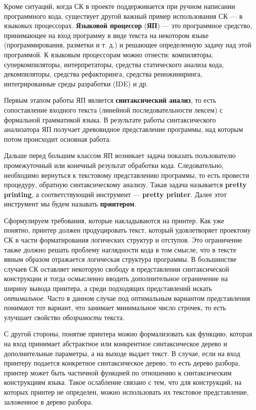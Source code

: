 Кроме ситуаций, когда СК в проекте поддерживается при ручном написании
программного кода, существует другой важный пример использования СК ---
в языковых процессорах. \textbf{Языковой процессор} (\textbf{ЯП}) ---
это программное средство, принимающее на вход программу в виде текста
на некотором языке (программирования, разметки и т. д.) и решающее
определенную задачу над этой программой. К языковым процессорам можно
отнести: компиляторы, суперкомпиляторы, интерпретаторы,
средства статического анализа кода, декомпиляторы, средства рефакторинга,
средства реинжиниринга, интегрированные среды разработки (IDE) и др.

Первым этапом работы ЯП является \textbf{синтаксический анализ}, то есть
сопоставление входного текста (линейной последовательности лексем) с формальной
грамматикой языка. В результате работы синтаксического анализатора ЯП получает
древовидное представление программы, над которым потом происходит основная работа.

Дальше перед большим классом ЯП возникает задача показать пользователю
промежуточный или конечный результат обработки кода.
Следовательно, необходимо вернуться к текстовому представлению программы,
то есть провести процедуру, обратную синтаксическому анализу. Такая задача
называется \textbf{pretty printing}, а соответствующий инструмент ---
\textbf{pretty printer}. Далее этот инструмент мы будем называть
\textbf{принтером}.

Сформулируем требования, которые накладываются на принтер.
Как уже понятно, принтер должен
продуцировать текст, который удовлетворяет проектому СК в части
форматирования логических структур и отступов.
Это ограничение также должно решать проблему наглядности кода в том смысле,
что в тексте явным образом отражается логическая структура программы.
В большинстве случаев СК оставляет некоторую свободу в представлении
синтаксической конструкции и тогда осмысленно вводить дополнительное
ограничение на ширину вывода принтера, а среди подходящих представлений
искать \textit{оптимальное}. Часто в данном случае под
оптимальным вариантом представления понимают тот вариант,
что занимает минимальное число строчек,
то есть улучшает свойство \textit{обозримости} текста.

С другой стороны, понятие принтера можно формализовать как функцию,
которая на вход принимает
абстрактное или конкрентное синтаксическое дерево и дополнительные параметры,
а на выходе выдает текст. В случае, если на вход принтеру подается конкретное
синтаксическое дерево, то есть дерево разбора, принтер может быть частичной
функцией по отношению к синтаксическим конструкциям языка.
Такое ослабление связано
с тем, что для конструкций, на которых принтер не определен, можно использовать
их текстовое представление, заложенное в дерево разбора.   

